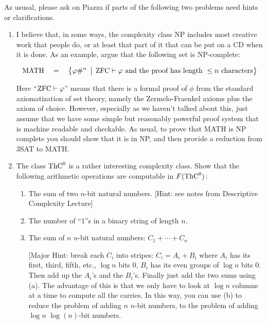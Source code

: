 \documentclass[12pt]{article}
\begin{document}
\thispagestyle{empty}
\noindent{}
\addtocounter{section}{9}

As ususal, please ask on Piazza if parts of the following two problems need hints or clarifications.

\begin{enumerate}

\item I believe that, in some ways, the complexity class NP includes most creative work that
people do, or at least that part of it that can be put on a CD when it is
done.  As an example, argue that the following set is NP-complete:

\[ \mbox{MATH}\quad =\quad \bigl\{ \varphi \#^n \,\bigm|\, \mbox{ZFC}\vdash\varphi \mbox{ and the
proof has length } \leq n \mbox{ characters} \bigr\}\]

Here ``$\mbox{ZFC}\vdash\varphi$'' means that there is a formal proof of $\phi$ from the standard
axiomatization 
of set theory, namely the Zermelo-Fraenkel axioms plus the axiom of choice.  However, especially as
we haven't talked about this, just assume that we have some simple but reasonably powerful
proof system that is machine readable and checkable.  As usual, to prove that MATH is NP complete
you should show that it is in NP, and then provide a reduction from 3SAT to MATH.


\item The class $\mbox{{\rm ThC}}^0$ is a rather interesting complexity class.  Show
that the following arithmetic operations are computable in $F(\mbox{{\rm ThC}}^0)$:
\begin{enumerate}
\item The sum of two $n$-bit natural numbers.  [Hint: see notes from Descriptive Complexity Lecture]
\item The number of ``1''s in a binary string of length $n$.
\item The sum of $n$ $n$-bit natural numbers: $C_1 + \cdots + C_n$

[Major Hint: break each $C_i$ into stripes: $C_i = A_i + B_i$ where $A_i$
has its first, third, fifth, etc.,  $\log n$ bits 0, $B_i$ has its even
groups of $\log n$ bits 0.  Then add up the $A_i$'s and the
$B_i$'s.  Finally just add the two sums using (a). The advantage of this is
that we only have to look at $\log n$ columns at a time to compute all the
carries.  In this way, you can use (b) to  reduce the problem of adding $n$ $n$-bit
numbers, to the problem of adding $\log n$ $\log(n)$-bit numbers.  


\end{enumerate}
\end{enumerate}
\end{document}
